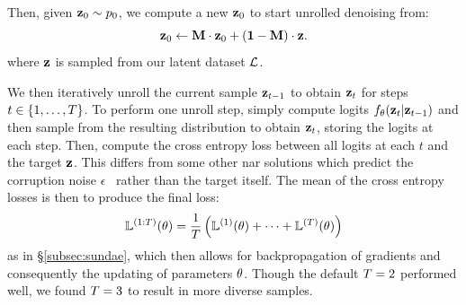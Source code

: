 Then, given $\mathbf{z}_0 \sim p_0$, we compute a new $\mathbf{z}_0$ to start unrolled
denoising from:
\begin{equation}
    \mathbf{z}_0 \leftarrow \mathbf{M} \cdot \mathbf{z}_0 + (\mathbf{1} - \mathbf{M})
    \cdot \mathbf{z} \text{.}
\end{equation}
where $\mathbf{z}$ is sampled from our latent dataset $\mathcal{L}$.

We then iteratively unroll the current sample $\mathbf{z}_{t-1}$ to obtain
$\mathbf{z}_t$ for steps $t\in \{1, \dots, T\}$. To perform one unroll
step, simply compute logits $f_\theta(\mathbf{z}_t \vert \mathbf{z}_{t-1})$ and then
sample from the resulting distribution to obtain $\mathbf{z}_t$, storing the logits
at each step. Then, compute the cross entropy loss between all logits at each
$t$ and the target $\mathbf{z}$. This differs from some other \gls{nar} solutions
which predict the corruption noise $\epsilon$~\cite{ho2020ddpm} rather than the
target itself. The mean of the cross entropy losses is then to produce the final
loss: 
\begin{equation} 
    \mathbb{L}^{(1:T)}(\theta) = \frac{1}{T} \left(\mathbb{L}^{(1)}(\theta) +
    \dots + \mathbb{L}^{(T)}(\theta) \right) 
\end{equation} 
as in \S\ref{subsec:sundae}, which then allows for backpropagation of gradients
and consequently the updating of parameters $\theta$. Though the
default $T = 2$ performed well, we found $T = 3$ to result
in more diverse samples.

